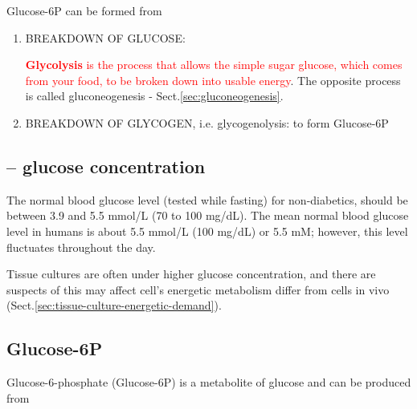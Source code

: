 \begin{mdframed}

Glucose-6P can be formed from 
\begin{enumerate}
  \item BREAKDOWN OF GLUCOSE:

\textcolor{red}{{\bf Glycolysis} is the process that allows the simple sugar
glucose, which comes from your food, to be broken down into usable energy}.
The opposite process is called gluconeogenesis - Sect.\ref{sec:gluconeogenesis}.

\label{sec:glyocogenolysis}
  \item BREAKDOWN OF GLYCOGEN, i.e. glycogenolysis: to form Glucose-6P


\end{enumerate}
\end{mdframed}


\subsection{-- glucose concentration}
\label{sec:glucose-concentration}


The normal blood glucose level (tested while fasting) for non-diabetics, should
be between 3.9 and 5.5 mmol/L (70 to 100 mg/dL). The mean normal blood glucose
level in humans is about 5.5 mmol/L (100 mg/dL) or 5.5 mM; however, this level
fluctuates throughout the day.

Tissue cultures are often under higher glucose concentration, and there are
suspects of this may affect cell's energetic metabolism differ from cells in
vivo (Sect.\ref{sec:tissue-culture-energetic-demand}).


\subsection{Glucose-6P}
\label{sec:Glucose-6P}

Glucose-6-phosphate (Glucose-6P) is a metabolite of glucose and can be produced
from

